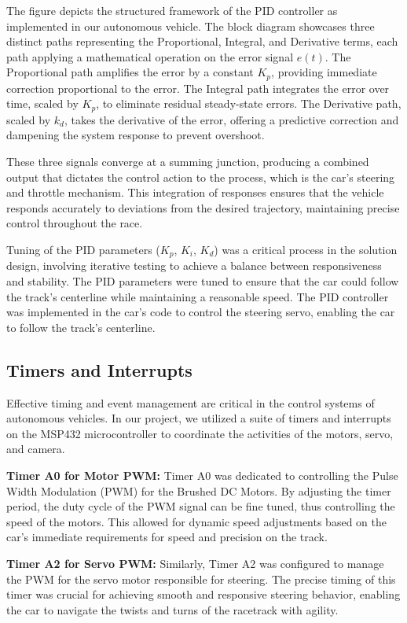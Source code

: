 \documentclass[conference]{IEEEtran}
\begin{document}
The figure depicts the structured framework of the PID controller as implemented in our autonomous vehicle. The block diagram showcases three distinct paths representing the Proportional, Integral, and Derivative terms, each path applying a mathematical operation on the error signal $e(t)$. The Proportional path amplifies the error by a constant $K_p$, providing immediate correction proportional to the error. The Integral path integrates the error over time, scaled by $K_p$, to eliminate residual steady-state errors. The Derivative path, scaled by $k_d$, takes the derivative of the error, offering a predictive correction and dampening the system response to prevent overshoot.

These three signals converge at a summing junction, producing a combined output that dictates the control action to the process, which is the car's steering and throttle mechanism. This integration of responses ensures that the vehicle responds accurately to deviations from the desired trajectory, maintaining precise control throughout the race.

Tuning of the PID parameters ($K_p$, $K_i$, $K_d$) was a critical process in the solution design, involving iterative testing to achieve a balance between responsiveness and stability. The PID parameters were tuned to ensure that the car could follow the track's centerline while maintaining a reasonable speed. The PID controller was implemented in the car's code to control the steering servo, enabling the car to follow the track's centerline.

\subsection{Timers and Interrupts}

Effective timing and event management are critical in the control systems of autonomous vehicles. In our project, we utilized a suite of timers and interrupts on the MSP432 microcontroller to coordinate the activities of the motors, servo, and camera.

\textbf{Timer A0 for Motor PWM:} Timer A0 was dedicated to controlling the Pulse Width Modulation (PWM) for the Brushed DC Motors. By adjusting the timer period, the duty cycle of the PWM signal can be fine tuned, thus controlling the speed of the motors. This allowed for dynamic speed adjustments based on the car's immediate requirements for speed and precision on the track.

\textbf{Timer A2 for Servo PWM:} Similarly, Timer A2 was configured to manage the PWM for the servo motor responsible for steering. The precise timing of this timer was crucial for achieving smooth and responsive steering behavior, enabling the car to navigate the twists and turns of the racetrack with agility.
\end{document}
